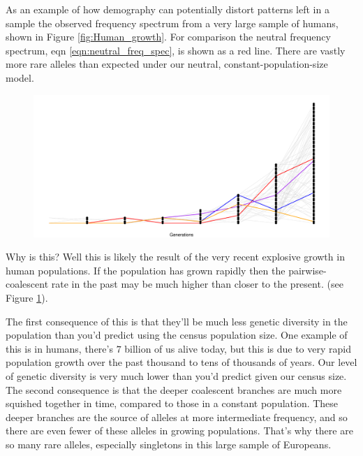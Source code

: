 As an example of how demography can potentially distort patterns left
in a sample the observed frequency spectrum from a very large sample of humans, shown in Figure \ref{fig:Human_growth}. For
comparison the neutral frequency spectrum, eqn
\eqref{eqn:neutral_freq_spec}, is shown as a red line. There are
  vastly more rare alleles than expected under our neutral, constant-population-size model. 

\begin{figure}
\begin{center}
  \includegraphics[width = \textwidth]{figures/Genetic_drift/Demography/Growth_genealogy.pdf}
\end{center}
\caption{} \label{fig:Genealogy_growth}
\end{figure}

Why is this? Well this is likely the result of the very recent
explosive growth in human populations. If the population has grown rapidly then the pairwise-coalescent
rate in the past may be much higher than closer to the present. (see Figure \ref{fig:Genealogy_growth}). 

The first consequence of this is that they'll be much less genetic
diversity in the population than you'd predict using the census
population size. One example of this is in humans, there's $7$ billion
of us alive today, but this is due to very rapid population growth
over the past thousand to tens of thousands of years. Our level of
genetic diversity is very much lower than you'd predict given our
census size. The second consequence is that the deeper coalescent branches are
much more squished together in time, compared to those in a constant
population.  These deeper branches are the source of alleles at more
intermediate frequency, and so there are even fewer of these alleles
in growing populations. That's why there are so many rare alleles,
especially singletons in this large sample of Europeans. 


